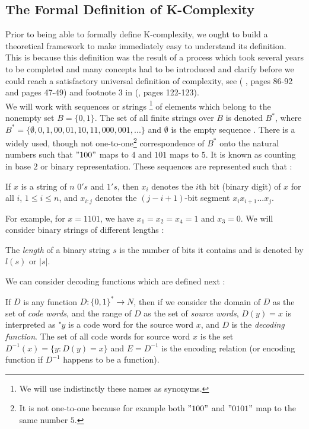 \subsection{The Formal Definition of K-Complexity}
Prior to being able to formally define K-complexity, we ought to build a theoretical framework to make immediately easy to understand its definition. This is because this definition was the result of a process which took several years to be completed and many concepts had to be introduced and clarify before we could reach a satisfactory universal definition of complexity, see (\cite{kolmo_book} , pages 86-92 and pages 47-49) and footnote 3 in (\cite{kolmo_book2}, pages 122-123).\\

We will work with sequences or strings \footnote{We will use indistinctly these names as synonyms.} of elements which belong to the nonempty set $B=\{0,1\}$. The set of all finite strings over $B$ is denoted $B^{*}$, where $B^{*}=\{ \emptyset,0,1,00,01,10,11,000,001,... \} $ and $\emptyset$ is the empty sequence \cite{kolmo_book}. There is a widely used, though not one-to-one\footnote{It is not one-to-one because for example both $"100"$ and $"0101"$ map to the same number $5$.} correspondence of $B^{*}$ onto the natural numbers such that $"100"$ maps to $4$ and $101$ maps to $5$. It is known as counting in base $2$ or binary representation. These sequences are represented such that \cite{kolmo_book}:\\

\begin{defn}
If $x$ is a string of $n$ $0's$ and $1's$, then $x_{i}$ denotes the $i$th bit (binary digit) of $x$ for all $i$, $1 \leq i \leq n$, and $x_{i:j}$ denotes the $(j-i+1)$-bit segment $x_{i} x_{i+1} ...x_{j}$.
\end{defn}

For example, for $x=1101$, we have $x_{1}=x_{2}=x_{4}=1$ and $x_{3}=0$. We will consider binary strings of different lengths \cite{kolmo_book}:

\begin{defn}
\label{length}
The \textit{length} of a binary string $s$ is the number of bits it contains and is denoted by $l(s)$ or $|s|$.
\end{defn}

We can consider decoding functions which are defined next \cite{kolmo_book}:
\begin{defn}
If $D$ is any function $D: \{0,1\}^{*} \rightarrow N$, then if we consider the domain of $D$ as the set of \textit{code words}, and the range of $D$ as the set of \textit{source words}, $D(y)=x$ is interpreted as "$y$ is a code word for the source word $x$, and $D$ is the  \textit{decoding function}. The set of all code words for source word $x$ is the set $D^{-1} (x)=\{y:D(y)=x\}$ and $E=D^{-1}$ is the encoding relation (or encoding function if $D^{-1}$ happens to be a function).
\end{defn}

